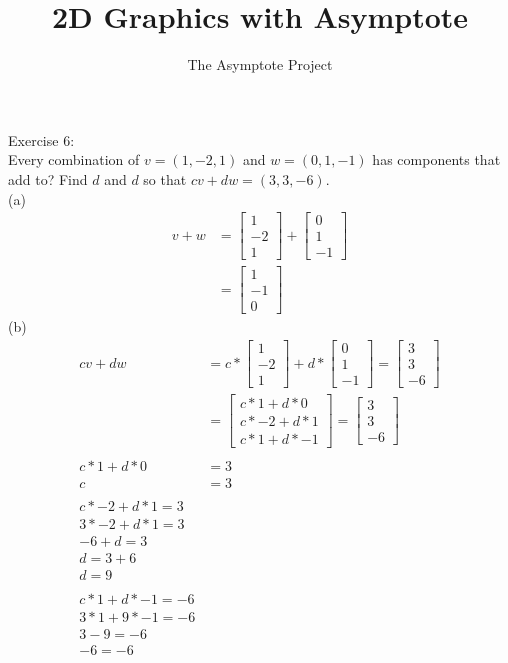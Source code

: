 \documentclass[12pt]{article}
\title{2D Graphics with Asymptote}
\author{The Asymptote Project}
\begin{document}
Exercise 6:\\
Every combination of $v=(1,-2,1)$ and $w=(0,1,-1)$ has components that  add to? Find $d$ and $d$ so that $cv+dw=(3,3,-6)$.\\
(a)\\
\begin{align*}
	v+w &= \begin{bmatrix}1\\-2\\1\end{bmatrix} + \begin{bmatrix}0\\1\\-1\end{bmatrix}\\
	&= \begin{bmatrix}1\\-1\\0\end{bmatrix}
\end{align*}
(b)
\begin{align*}
cv+dw &= c*\begin{bmatrix}1\\-2\\1\end{bmatrix} + d*\begin{bmatrix}0\\1\\-1\end{bmatrix} = \begin{bmatrix}3\\3\\-6\end{bmatrix}\\
	&= \begin{bmatrix}c*1+d*0\\c*-2+d*1\\c*1+d*-1\end{bmatrix} = \begin{bmatrix}3\\3\\-6\end{bmatrix}\\
	\\
	c*1+d*0&=3\\
	c&=3\\
	\\
	c*-2+d*1 = 3\\
	3*-2+d*1 = 3\\	
	-6+d = 3\\		
	d = 3 + 6\\			
	d = 9\\		
	\\
	c*1+d*-1=-6\\
	3*1+9*-1=-6\\
	3-9=-6\\	
	-6=-6\\
\end{align*}
\end{document}
